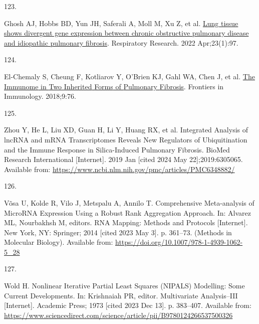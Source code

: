 \documentclass[
]{article}
\newlength{\cslhangindent}
\newlength{\csllabelwidth}
\newlength{\cslentryspacingunit} %
\newenvironment{CSLReferences}[2] %
 {%
  \setlength{\parindent}{0pt}
  \ifodd #1
  \let\oldpar\par
  \def\par{\hangindent=\cslhangindent\oldpar}
  \fi
  \setlength{\parskip}{#2\cslentryspacingunit}
 }%
 {}
\newcommand{\CSLLeftMargin}[1]{\parbox[t]{\csllabelwidth}{#1}}
\newcommand{\CSLRightInline}[1]{\parbox[t]{\linewidth - \csllabelwidth}{#1}\break}
\begin{document}
\begin{CSLReferences}{0}{0}
\leavevmode{}%
\CSLLeftMargin{123. }%
\CSLRightInline{Ghosh AJ, Hobbs BD, Yun JH, Saferali A, Moll M, Xu Z, et al. \href{https://doi.org/10.1186/s12931-022-02013-w}{Lung tissue shows divergent gene expression between chronic obstructive pulmonary disease and idiopathic pulmonary fibrosis}. Respiratory Research. 2022 Apr;23(1):97. }

\leavevmode{}%
\CSLLeftMargin{124. }%
\CSLRightInline{El-Chemaly S, Cheung F, Kotliarov Y, O'Brien KJ, Gahl WA, Chen J, et al. \href{https://doi.org/10.3389/fimmu.2018.00076}{The {Immunome} in {Two} {Inherited} {Forms} of {Pulmonary} {Fibrosis}}. Frontiers in Immunology. 2018;9:76. }

\leavevmode{}%
\CSLLeftMargin{125. }%
\CSLRightInline{Zhou Y, He L, Liu XD, Guan H, Li Y, Huang RX, et al. Integrated {Analysis} of {lncRNA} and {mRNA} {Transcriptomes} {Reveals} {New} {Regulators} of {Ubiquitination} and the {Immune} {Response} in {Silica}-{Induced} {Pulmonary} {Fibrosis}. BioMed Research International {[}Internet{]}. 2019 Jan {[}cited 2024 May 22{]};2019:6305065. Available from: \url{https://www.ncbi.nlm.nih.gov/pmc/articles/PMC6348882/}}

\leavevmode{}%
\CSLLeftMargin{126. }%
\CSLRightInline{Võsa U, Kolde R, Vilo J, Metspalu A, Annilo T. Comprehensive {Meta}-analysis of {MicroRNA} {Expression} {Using} a {Robust} {Rank} {Aggregation} {Approach}. In: Alvarez ML, Nourbakhsh M, editors. {RNA} {Mapping}: {Methods} and {Protocols} {[}Internet{]}. New York, NY: Springer; 2014 {[}cited 2023 May 3{]}. p. 361--73. (Methods in {Molecular} {Biology}). Available from: \url{https://doi.org/10.1007/978-1-4939-1062-5_28}}

\leavevmode{}%
\CSLLeftMargin{127. }%
\CSLRightInline{Wold H. Nonlinear {Iterative} {Partial} {Least} {Squares} ({NIPALS}) {Modelling}: {Some} {Current} {Developments}. In: Krishnaiah PR, editor. Multivariate {Analysis}--{III} {[}Internet{]}. Academic Press; 1973 {[}cited 2023 Dec 13{]}. p. 383--407. Available from: \url{https://www.sciencedirect.com/science/article/pii/B9780124266537500326}}

\end{CSLReferences}

\clearpage

\setlength{\parindent}{4em} 
\linespread{1}
\doublespacing
\end{document}
